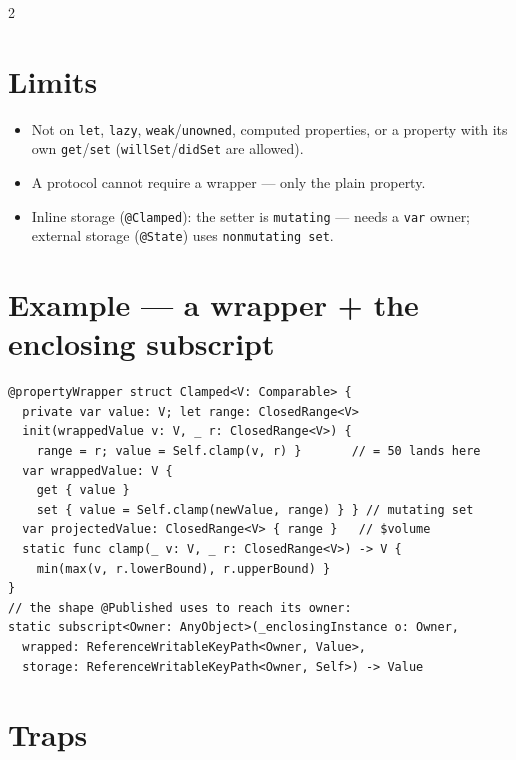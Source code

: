 \documentclass[8pt]{extarticle}
\begin{document}
\begin{multicols}{2}
\section{Limits}
\begin{itemize}
  \item Not on \texttt{let}, \texttt{lazy}, \texttt{weak}/\texttt{unowned}, computed
        properties, or a property with its own \texttt{get}/\texttt{set}
        (\texttt{willSet}/\texttt{didSet} are allowed).
  \item A protocol cannot require a wrapper — only the plain property.
  \item Inline storage (\texttt{@Clamped}): the setter is \texttt{mutating} — needs a
        \texttt{var} owner; external storage (\texttt{@State}) uses \texttt{nonmutating set}.
\end{itemize}

\columnbreak

\section{Example — a wrapper + the enclosing subscript}
\begin{lstlisting}[language=SwiftSheet]
@propertyWrapper struct Clamped<V: Comparable> {
  private var value: V; let range: ClosedRange<V>
  init(wrappedValue v: V, _ r: ClosedRange<V>) {
    range = r; value = Self.clamp(v, r) }       // = 50 lands here
  var wrappedValue: V {
    get { value }
    set { value = Self.clamp(newValue, range) } } // mutating set
  var projectedValue: ClosedRange<V> { range }   // $volume
  static func clamp(_ v: V, _ r: ClosedRange<V>) -> V {
    min(max(v, r.lowerBound), r.upperBound) }
}
// the shape @Published uses to reach its owner:
static subscript<Owner: AnyObject>(_enclosingInstance o: Owner,
  wrapped: ReferenceWritableKeyPath<Owner, Value>,
  storage: ReferenceWritableKeyPath<Owner, Self>) -> Value
\end{lstlisting}

\section{Traps}
\begin{itemize}
\end{itemize}


\end{multicols}
\end{document}
